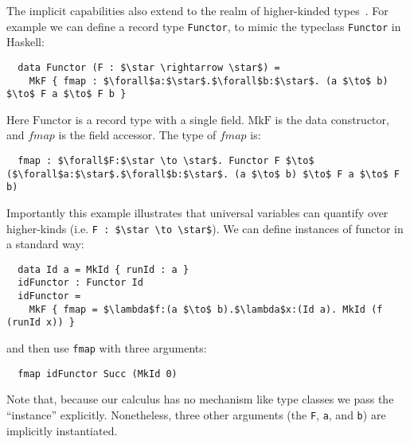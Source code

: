 The implicit capabilities also extend to the realm of higher-kinded types~\cite{tapl}.
For example we can define a record type \lstinline{Functor},
to mimic the typeclass\cite{typeclasseswadler,typeclasseskaes} \lstinline{Functor} in Haskell:
\newcommand{\Functor}[0]{\mathrm{Functor}}
\newcommand{\MkFunctor}[0]{\mathrm{MkF}}
\newcommand{\Id}[0]{\mathrm{Id}}
\newcommand{\MkId}[0]{\mathrm{MkId}}
\newcommand{\fmap}[0]{fmap}
\begin{lstlisting}
  data Functor (F : $\star \rightarrow \star$) =
    MkF { fmap : $\forall$a:$\star$.$\forall$b:$\star$. (a $\to$ b) $\to$ F a $\to$ F b }
\end{lstlisting}
\noindent Here $\Functor$ is a record type with a single field. $\MkFunctor$ is the data constructor,
and $\fmap$ is the field accessor.
The type of $fmap$ is:
\begin{lstlisting}
  fmap : $\forall$F:$\star \to \star$. Functor F $\to$ ($\forall$a:$\star$.$\forall$b:$\star$. (a $\to$ b) $\to$ F a $\to$ F b)
\end{lstlisting}
Importantly this example illustrates that universal variables can quantify over higher-kinds (i.e.
\lstinline{F : $\star \to \star$}).
We can define instances of functor in a standard way:
\begin{lstlisting}
  data Id a = MkId { runId : a }
  idFunctor : Functor Id
  idFunctor =
    MkF { fmap = $\lambda$f:(a $\to$ b).$\lambda$x:(Id a). MkId (f (runId x)) }
\end{lstlisting}
and then use \lstinline{fmap} with three arguments:
\begin{lstlisting}
  fmap idFunctor Succ (MkId 0)
\end{lstlisting}
\noindent Note that, because our calculus has no mechanism like type classes we pass the ``instance'' explicitly.
Nonetheless, three other arguments (the \lstinline{F}, \lstinline{a}, and \lstinline{b}) are implicitly instantiated.

